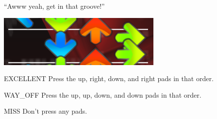 ``Awww yeah, get in that groove!''

\begin{center}
  \includegraphics{itg-urdr.png}
\end{center}

\begin{switch}
\item{EXCELLENT}
  Press the up, right, down, and right pads in that order.
\item{WAY\_OFF}
  Press the up, up, down, and down pads in that order.
\item{MISS}
  Don't press any pads.
\end{switch}


